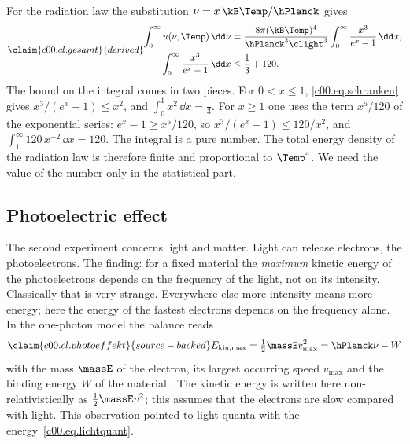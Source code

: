 \begin{vertiefung}
  For the radiation law the substitution $\nu = x\,\kB\Temp/\hPlanck$ gives
  \begin{equation}\label{c00.eq.gesamt}\claim{c00.cl.gesamt}{derived}
    \begin{aligned}
      \int_0^{\infty} u(\nu, \Temp)\,\dd\nu
      &= \frac{8\pi (\kB\Temp)^4}{\hPlanck^3 \clight^3} \int_0^\infty \frac{x^3}{e^x - 1}\,\dd x , \\
      \int_0^\infty \frac{x^3}{e^x - 1}\,\dd x &\leq \frac13 + 120 .
    \end{aligned}
  \end{equation}
  The bound on the integral comes in two pieces. For $0 < x \leq 1$,
  \eqref{c00.eq.schranken} gives $x^3/(e^x-1) \leq x^2$, and
  $\int_0^1 x^2\,\dd x = \tfrac13$. For $x \geq 1$ one uses the term $x^5/120$ of the
  exponential series: $e^x - 1 \geq x^5/120$, so $x^3/(e^x-1) \leq 120/x^2$, and
  $\int_1^\infty 120\,x^{-2}\,\dd x = 120$. The integral is a pure number. The total energy
  density of the radiation law is therefore finite and proportional to $\Temp^4$. We need the
  value of the number only in the statistical part.
\end{vertiefung}

\subsection{Photoelectric effect}\label{c00.s4.2}

The second experiment concerns light and matter. Light can release electrons, the
photoelectrons. The finding: for a fixed material the \emph{maximum} kinetic energy of the
photoelectrons depends on the frequency of the light, not on its intensity. Classically that
is very strange. Everywhere else more intensity means more energy; here the energy of the
fastest electrons depends on the frequency alone. In the one-photon model the balance reads
\begin{equation}\label{c00.eq.photoeffekt}\claim{c00.cl.photoeffekt}{source-backed}
  E_{\mathrm{kin,max}} = \tfrac12 \massE v_{\max}^2 = \hPlanck\nu - W
\end{equation}
with the mass $\massE$ of the electron, its largest occurring speed $v_{\max}$ and the
binding energy $W$ of the material . The
kinetic energy is written here non-relativistically as $\tfrac12 \massE v^2$; this assumes
that the electrons are slow compared with light. This observation pointed to light quanta
with the energy~\eqref{c00.eq.lichtquant}.

